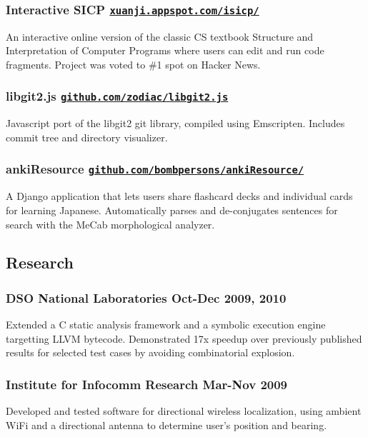 \documentclass[letterpaper]{article}
\begin{document}
\subsubsection*{Interactive SICP \hfill \href{http://xuanji.appspot.com/isicp/}{\tt xuanji.appspot.com/isicp/}}
An interactive online version of the classic CS textbook Structure and Interpretation of Computer Programs where users can edit and run code fragments. Project was voted to \#1 spot on Hacker News.

\subsubsection*{libgit2.js \hfill \href{https://github.com/zodiac/libgit2.js}{\tt github.com/zodiac/libgit2.js}}
Javascript port of the libgit2 git library, compiled using Emscripten. Includes commit tree and directory visualizer.

\subsubsection*{ankiResource \hfill \href{https://github.com/bombpersons/ankiResource}{\tt github.com/bombpersons/ankiResource/}}
A Django application that lets users share flashcard decks and individual cards for learning Japanese. Automatically parses and de-conjugates sentences for search with the MeCab morphological analyzer.

\vspace{1em}

\begin{center}
\section*{Research}
\end{center}

\subsubsection*{DSO National Laboratories \hfill Oct-Dec 2009, 2010}
Extended a C static analysis framework and a symbolic execution engine targetting LLVM bytecode. Demonstrated 17x speedup over previously published results for selected test cases by avoiding combinatorial explosion.

\subsubsection*{Institute for Infocomm Research \hfill Mar-Nov 2009}
Developed and tested software for directional wireless localization, using ambient WiFi and a directional antenna to determine user's position and bearing.
\end{document}
